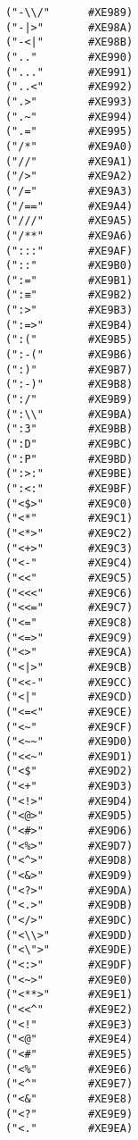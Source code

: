\documentclass[11pt]{article}
\begin{document}
\begin{verbatim}
            ("-\\/"      #XE989)
            ("-|>"       #XE98A)
            ("-<|"       #XE98B)
            (".."        #XE990)
            ("..."       #XE991)
            ("..<"       #XE992)
            (".>"        #XE993)
            (".~"        #XE994)
            (".="        #XE995)
            ("/*"        #XE9A0)
            ("//"        #XE9A1)
            ("/>"        #XE9A2)
            ("/="        #XE9A3)
            ("/=="       #XE9A4)
            ("///"       #XE9A5)
            ("/**"       #XE9A6)
            (":::"       #XE9AF)
            ("::"        #XE9B0)
            (":="        #XE9B1)
            (":≡"        #XE9B2)
            (":>"        #XE9B3)
            (":=>"       #XE9B4)
            (":("        #XE9B5)
            (":-("       #XE9B6)
            (":)"        #XE9B7)
            (":-)"       #XE9B8)
            (":/"        #XE9B9)
            (":\\"       #XE9BA)
            (":3"        #XE9BB)
            (":D"        #XE9BC)
            (":P"        #XE9BD)
            (":>:"       #XE9BE)
            (":<:"       #XE9BF)
            ("<$>"       #XE9C0)
            ("<*"        #XE9C1)
            ("<*>"       #XE9C2)
            ("<+>"       #XE9C3)
            ("<-"        #XE9C4)
            ("<<"        #XE9C5)
            ("<<<"       #XE9C6)
            ("<<="       #XE9C7)
            ("<="        #XE9C8)
            ("<=>"       #XE9C9)
            ("<>"        #XE9CA)
            ("<|>"       #XE9CB)
            ("<<-"       #XE9CC)
            ("<|"        #XE9CD)
            ("<=<"       #XE9CE)
            ("<~"        #XE9CF)
            ("<~~"       #XE9D0)
            ("<<~"       #XE9D1)
            ("<$"        #XE9D2)
            ("<+"        #XE9D3)
            ("<!>"       #XE9D4)
            ("<@>"       #XE9D5)
            ("<#>"       #XE9D6)
            ("<%>"       #XE9D7)
            ("<^>"       #XE9D8)
            ("<&>"       #XE9D9)
            ("<?>"       #XE9DA)
            ("<.>"       #XE9DB)
            ("</>"       #XE9DC)
            ("<\\>"      #XE9DD)
            ("<\">"      #XE9DE)
            ("<:>"       #XE9DF)
            ("<~>"       #XE9E0)
            ("<**>"      #XE9E1)
            ("<<^"       #XE9E2)
            ("<!"        #XE9E3)
            ("<@"        #XE9E4)
            ("<#"        #XE9E5)
            ("<%"        #XE9E6)
            ("<^"        #XE9E7)
            ("<&"        #XE9E8)
            ("<?"        #XE9E9)
            ("<."        #XE9EA)

\end{verbatim}
\end{document}
